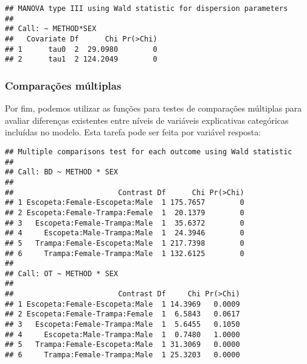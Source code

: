 
\begin{knitrout}
\color{fgcolor}\begin{kframe}
\begin{alltt}
                      \hlstd{=} \hlstd{(}\hlstd{,}\hlstd{),}
                      \hlstd{=} \hlstd{(}\hlstd{,} \hlstd{))}
\end{alltt}
\begin{verbatim}
## MANOVA type III using Wald statistic for dispersion parameters
## 
## Call: ~ METHOD*SEX
##   Covariate Df      Chi Pr(>Chi)
## 1      tau0  2  29.0980        0
## 2      tau1  2 124.2049        0
\end{verbatim}
\end{kframe}
\end{knitrout}

\subsubsection{Comparações múltiplas}

Por fim, podemos utilizar as funções para testes de comparações múltiplas para avaliar diferenças existentes entre níveis de variáveis explicativas categóricas incluídas no modelo. Esta tarefa pode ser feita por variável resposta:

\begin{knitrout}
\color{fgcolor}\begin{kframe}
\begin{alltt}
\hlstd{(} 
             \hlstd{=} \hlstd{(}\hlstd{(}\hlstd{,} \hlstd{),}
                          \hlstd{(}\hlstd{,} \hlstd{)),}
             
\end{alltt}
\begin{verbatim}
## Multiple comparisons test for each outcome using Wald statistic
## 
## Call: BD ~ METHOD * SEX
## 
##                        Contrast Df      Chi Pr(>Chi)
## 1 Escopeta:Female-Escopeta:Male  1 175.7657        0
## 2 Escopeta:Female-Trampa:Female  1  20.1379        0
## 3   Escopeta:Female-Trampa:Male  1  35.6372        0
## 4     Escopeta:Male-Trampa:Male  1  24.3946        0
## 5   Trampa:Female-Escopeta:Male  1 217.7398        0
## 6     Trampa:Female-Trampa:Male  1 132.6125        0
## 
## Call: OT ~ METHOD * SEX
## 
##                        Contrast Df     Chi Pr(>Chi)
## 1 Escopeta:Female-Escopeta:Male  1 14.3969   0.0009
## 2 Escopeta:Female-Trampa:Female  1  6.5843   0.0617
## 3   Escopeta:Female-Trampa:Male  1  5.6455   0.1050
## 4     Escopeta:Male-Trampa:Male  1  0.7480   1.0000
## 5   Trampa:Female-Escopeta:Male  1 31.3069   0.0000
## 6     Trampa:Female-Trampa:Male  1 25.3203   0.0000
\end{verbatim}
\end{kframe}
\end{knitrout}

